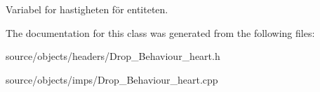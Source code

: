 Variabel for hastigheten för entiteten. 



The documentation for this class was generated from the following files\+:\begin{DoxyCompactItemize}
\item 
source/objects/headers/Drop\+\_\+\+Behaviour\+\_\+heart.\+h\item 
source/objects/imps/Drop\+\_\+\+Behaviour\+\_\+heart.\+cpp\end{DoxyCompactItemize}
